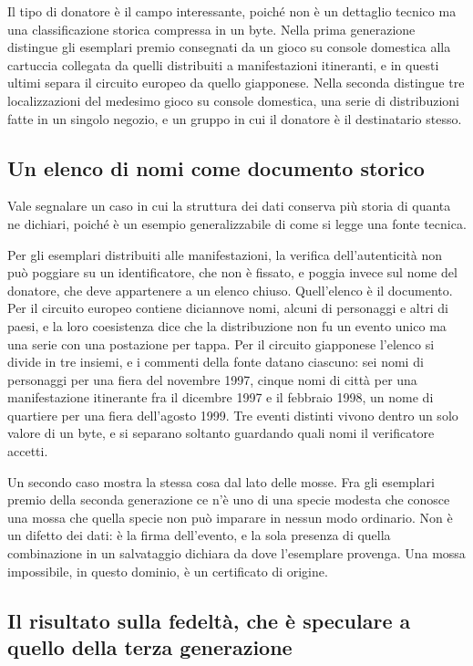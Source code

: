 Il tipo di donatore è il campo interessante, poiché non è un dettaglio tecnico ma una classificazione storica compressa in un byte. Nella prima generazione distingue gli esemplari premio consegnati da un gioco su console domestica alla cartuccia collegata da quelli distribuiti a manifestazioni itineranti, e in questi ultimi separa il circuito europeo da quello giapponese. Nella seconda distingue tre localizzazioni del medesimo gioco su console domestica, una serie di distribuzioni fatte in un singolo negozio, e un gruppo in cui il donatore è il destinatario stesso.

\subsection*{Un elenco di nomi come documento storico}

Vale segnalare un caso in cui la struttura dei dati conserva più storia di quanta ne dichiari, poiché è un esempio generalizzabile di come si legge una fonte tecnica.

Per gli esemplari distribuiti alle manifestazioni, la verifica dell'autenticità non può poggiare su un identificatore, che non è fissato, e poggia invece sul nome del donatore, che deve appartenere a un elenco chiuso. Quell'elenco è il documento. Per il circuito europeo contiene diciannove nomi, alcuni di personaggi e altri di paesi, e la loro coesistenza dice che la distribuzione non fu un evento unico ma una serie con una postazione per tappa. Per il circuito giapponese l'elenco si divide in tre insiemi, e i commenti della fonte datano ciascuno: sei nomi di personaggi per una fiera del novembre 1997, cinque nomi di città per una manifestazione itinerante fra il dicembre 1997 e il febbraio 1998, un nome di quartiere per una fiera dell'agosto 1999. Tre eventi distinti vivono dentro un solo valore di un byte, e si separano soltanto guardando quali nomi il verificatore accetti.

Un secondo caso mostra la stessa cosa dal lato delle mosse. Fra gli esemplari premio della seconda generazione ce n'è uno di una specie modesta che conosce una mossa che quella specie non può imparare in nessun modo ordinario. Non è un difetto dei dati: è la firma dell'evento, e la sola presenza di quella combinazione in un salvataggio dichiara da dove l'esemplare provenga. Una mossa impossibile, in questo dominio, è un certificato di origine.

\subsection*{Il risultato sulla fedeltà, che è speculare a quello della terza generazione}

